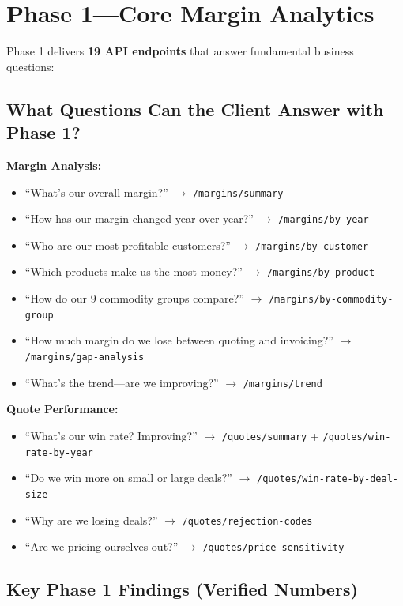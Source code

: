 \documentclass[11pt,a4paper]{article}
\newcommand{\code}[1]{\texttt{#1}}
\begin{document}
\section{Phase 1---Core Margin Analytics}

Phase 1 delivers \textbf{19 API endpoints} that answer fundamental business questions:

\subsection{What Questions Can the Client Answer with Phase 1?}

\textbf{Margin Analysis:}
\begin{itemize}[nosep]
  \item ``What's our overall margin?'' $\to$ \code{/margins/summary}
  \item ``How has our margin changed year over year?'' $\to$ \code{/margins/by-year}
  \item ``Who are our most profitable customers?'' $\to$ \code{/margins/by-customer}
  \item ``Which products make us the most money?'' $\to$ \code{/margins/by-product}
  \item ``How do our 9 commodity groups compare?'' $\to$ \code{/margins/by-commodity-group}
  \item ``How much margin do we lose between quoting and invoicing?'' $\to$ \code{/margins/gap-analysis}
  \item ``What's the trend---are we improving?'' $\to$ \code{/margins/trend}
\end{itemize}

\textbf{Quote Performance:}
\begin{itemize}[nosep]
  \item ``What's our win rate? Improving?'' $\to$ \code{/quotes/summary} + \code{/quotes/win-rate-by-year}
  \item ``Do we win more on small or large deals?'' $\to$ \code{/quotes/win-rate-by-deal-size}
  \item ``Why are we losing deals?'' $\to$ \code{/quotes/rejection-codes}
  \item ``Are we pricing ourselves out?'' $\to$ \code{/quotes/price-sensitivity}
\end{itemize}

\subsection{Key Phase 1 Findings (Verified Numbers)}
\end{document}
